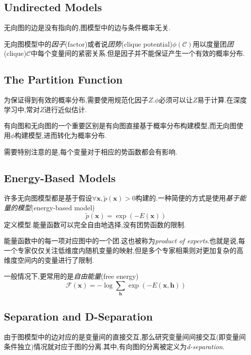 \subsection{Undirected Models}

无向图的边是没有指向的,图模型中的边与条件概率无关.

无向图模型中的\textit{因子}(factor)或者说\textit{团势}(clique potential)$\phi(\mathcal C)$用以度量团\textit{团}(clique)$\mathcal C$中每个变量间的紧密关系.但是因子并不能保证产生一个有效的概率分布.

\subsection{The Partition Function}

为保证得到有效的概率分布,需要使用规范化因子$Z$.$\phi$必须可以让$Z$易于计算.在深度学习中,常对$Z$进行近似估计.

有向图和无向图的一个重要区别是有向图直接基于概率分布构建模型,而无向图使用$\phi$构建模型,进而转化为概率分布.

需要特别注意的是,每个变量对于相应的势函数都会有影响.

\subsection{Energy-Based Models}

许多无向图模型都是基于假设$\forall\mathbf x,\tilde p(\mathbf x)>0$构建的.一种简便的方式是使用\textit{基于能量的模型}(energy-based model)
\begin{equation}
\tilde p(\mathbf x)=\exp(-E(\mathbf x))
\end{equation}
定义模型.能量函数可以完全自由地选择,没有团势函数的限制.

能量函数中的每一项对应图中的一个团.这也被称为\textit{product of experts}.也就是说,每一个专家仅仅关注低维度内随机变量的映射,但是多个专家相乘则对更加复杂的高维度空间内的变量进行了限制.

一般情况下,更常用的是\textit{自由能量}(free energy)
\begin{equation}
\mathcal F(\mathbf x)=-\log\sum_{\mathbf h}\exp(-E(\mathbf{x,h}))
\end{equation}

\subsection{Separation and D-Separation}

由于图模型中的边对应的是变量间的直接交互,那么研究变量间间接交互(即变量间条件独立)情况就对应于图的分离.其中,有向图的分离被定义为\textit{d-separation}.

